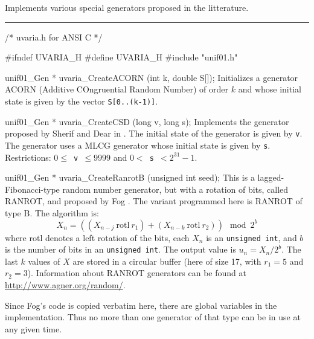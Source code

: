 
Implements various special generators proposed in the litterature.


\bigskip
\hrule
\code
\hide
/* uvaria.h for ANSI C */

#ifndef UVARIA_H
#define UVARIA_H
\endhide
#include "unif01.h"


unif01_Gen * uvaria_CreateACORN (int k, double S[]);
\endcode
  \tab  Initializes a generator ACORN (Additive COngruential Random Number)
  \cite{rWIK89a} of order $k$ and
%
   whose initial state is given by the vector {\tt S[0..(k-1)]}.
  \endtab
\code


unif01_Gen * uvaria_CreateCSD (long v, long s);
\endcode
  \tab Implements the generator proposed by Sherif and
%
   Dear in \cite{rSHE90a}.  The initial state of the generator is given
   by {\tt v}.  The generator uses a  MLCG generator whose
   initial state is given by {\tt s}.  Restrictions:
   {\tt $0 \le$ v $\le 9999$} and {\tt $0 <$ s $< 2^{31}-1$}.
  \endtab
\code


unif01_Gen * uvaria_CreateRanrotB (unsigned int seed);
\endcode
  \tab
  This is a lagged-Fibonacci-type random number generator, but
%
  with a rotation of bits, called RANROT, and proposed by 
  Fog \cite{rFOG01a}.  The variant programmed here is RANROT of type B.
  The algorithm is:
  $$
    X_n = \left((X_{n-j}\ \mbox{rotl}\  r_1) +
          (X_{n-k}\  \mbox{rotl}\  r_2)\right) \mod 2^b
  $$
  where rotl denotes a left rotation of the bits,
  each $X_n$ is an {\tt unsigned int}, 
  and $b$ is the number of bits in an {\tt unsigned int}. 
  The output value is $u_n = X_n/2^b$.
  The last $k$ values of $X$ are stored in a circular buffer 
  (here of size 17, with $r_1 = 5$ and $r_2 = 3$).
  Information about RANROT generators can be found at 
  \url{http://www.agner.org/random/}.

  Since Fog's code is copied verbatim here, there are global
  variables in the implementation. Thus no more than
  one generator of that type can be in use at any given time. 
 \endtab
\code


